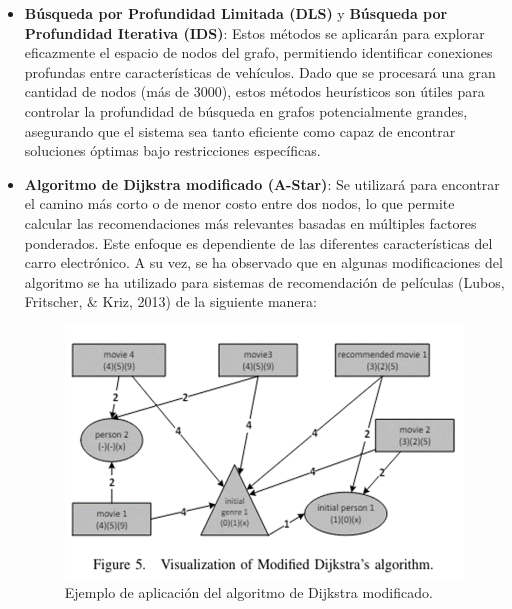 \documentclass[12pt]{article}
\begin{document}
\begin{itemize}
    \item \textbf{Búsqueda por Profundidad Limitada (DLS)} y \textbf{Búsqueda por Profundidad Iterativa (IDS)}: Estos métodos se aplicarán para explorar eficazmente el espacio de nodos del grafo, permitiendo identificar conexiones profundas entre características de vehículos. Dado que se procesará una gran cantidad de nodos (más de 3000), estos métodos heurísticos son útiles para controlar la profundidad de búsqueda en grafos potencialmente grandes, asegurando que el sistema sea tanto eficiente como capaz de encontrar soluciones óptimas bajo restricciones específicas.
    \item \textbf{Algoritmo de Dijkstra modificado (A-Star)}: Se utilizará para encontrar el camino más corto o de menor costo entre dos nodos, lo que permite calcular las recomendaciones más relevantes basadas en múltiples factores ponderados. Este enfoque es dependiente de las diferentes características del carro electrónico. A su vez, se ha observado que en algunas modificaciones del algoritmo se ha utilizado para sistemas de recomendación de películas (Lubos, Fritscher, \& Kriz, 2013) de la siguiente manera:
    
    \begin{figure}[htbp]
        \centering
        \includegraphics[width=\textwidth]{./imgs-latex/ejemplo-casos1-DijkstraModificado.png}
        \caption{Ejemplo de aplicación del algoritmo de Dijkstra modificado.}\label{fig:ejemplo-casos1-DijkstraModificado}
    \end{figure}
    
\end{itemize}
\end{document}

